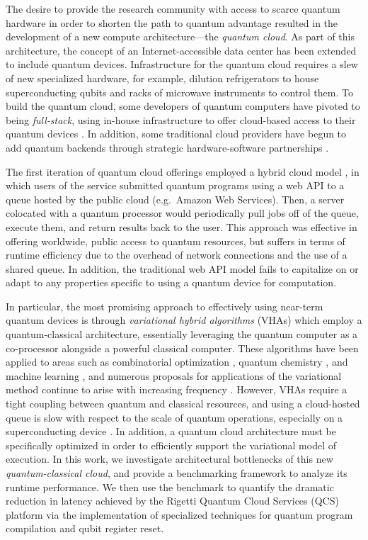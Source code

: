 \documentclass[12pt]{iopart}
\begin{document}
The desire to provide the research community with access to scarce quantum hardware in order to shorten the path to quantum advantage resulted in the development of a new compute architecture---the \textit{quantum cloud}. As part of this architecture, the concept of an Internet-accessible data center has been extended to include quantum devices. Infrastructure for the quantum cloud requires a slew of new specialized hardware, for example, dilution refrigerators to house superconducting qubits and racks of microwave instruments to control them. To build the quantum cloud, some developers of quantum computers have pivoted to being \textit{full-stack}, using in-house infrastructure to offer cloud-based access to their quantum devices \cite{IBMQuantumExperience, RigettiQCS}. In addition, some traditional cloud providers have begun to add quantum backends through strategic hardware-software partnerships \cite{MicrosoftAzureQuantum, AmazonBraket}.

The first iteration of quantum cloud offerings employed a hybrid cloud model \cite{NISTCloudComputing}, in which users of the service submitted quantum programs using a web API to a queue hosted by the public cloud (e.g.\ Amazon Web Services). Then, a server colocated with a quantum processor would periodically pull jobs off of the queue, execute them, and return results back to the user. This approach was effective in offering worldwide, public access to quantum resources, but suffers in terms of runtime efficiency due to the overhead of network connections and the use of a shared queue. In addition, the traditional web API model fails to capitalize on or adapt to any properties specific to using a quantum device for computation.

In particular, the most promising approach to effectively using near-term quantum devices is through \textit{variational hybrid algorithms} (VHAs) \cite{McCleanTheoryVQE} which employ a quantum-classical architecture, essentially leveraging the quantum computer as a co-processor alongside a powerful classical computer. These algorithms have been applied to areas such as combinatorial optimization \cite{FarhiQAOA, RigettiClustering}, quantum chemistry \cite{PeruzzoPhotonicVQE, GoogleXmonVQE}, and machine learning \cite{RigettiQKS}, and numerous proposals for applications of the variational method continue to arise with increasing frequency \cite{Bravo-PietroVQLS, GuillaumeVQT}. However, VHAs require a tight coupling between quantum and classical resources, and using a cloud-hosted queue is slow with respect to the scale of quantum operations, especially on a superconducting device \cite{OliverSCStateOfPlay}. In addition, a quantum cloud architecture must be specifically optimized in order to efficiently support the variational model of execution. In this work, we investigate architectural bottlenecks of this new \textit{quantum-classical cloud}, and provide a benchmarking framework to analyze its runtime performance. We then use the benchmark to quantify the dramatic reduction in latency achieved by the Rigetti Quantum Cloud Services (QCS) platform via the implementation of specialized techniques for quantum program compilation and qubit register reset.
\end{document}
